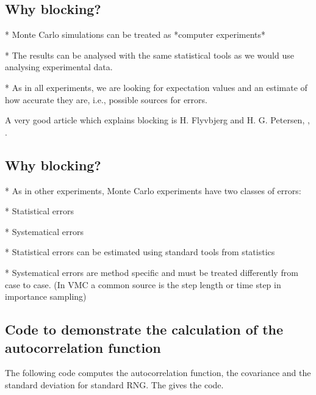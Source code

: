 \documentclass[letterpaper,10pt,english]{sphinxmanual}
\begin{document}
\subsection{Why blocking?}
\label{\detokenize{chapter3:why-blocking}}

\begin{sphinxVerbatim}[commandchars=\\\{\}]
* Monte Carlo simulations can be treated as *computer experiments*

* The results can be analysed with the same statistical tools as we would use analysing experimental data.

* As in all experiments, we are looking for expectation values and an estimate of how accurate they are, i.e., possible sources for errors.
\end{sphinxVerbatim}

A very good article which explains blocking is H. Flyvbjerg and H. G. Petersen, ,  .


\subsection{Why blocking?}
\label{\detokenize{chapter3:id16}}

\begin{sphinxVerbatim}[commandchars=\\\{\}]
* As in other experiments, Monte Carlo experiments have two classes of errors:

  * Statistical errors

  * Systematical errors


* Statistical errors can be estimated using standard tools from statistics

* Systematical errors are method specific and must be treated differently from case to case. (In VMC a common source is the step length or time step in importance sampling)
\end{sphinxVerbatim}


\subsection{Code to demonstrate the calculation of the autocorrelation function}
\label{\detokenize{chapter3:code-to-demonstrate-the-calculation-of-the-autocorrelation-function}}
The following code computes the autocorrelation function, the covariance and the standard deviation
for standard RNG.
The  gives the code.
\end{document}
